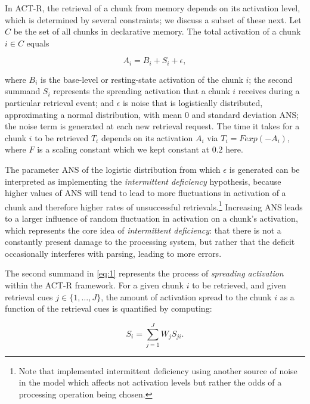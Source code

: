 \documentclass{cambridge7A}\usepackage[]{graphicx}\usepackage[]{color}
\begin{document}
In ACT-R, the retrieval of a chunk from memory depends on its activation level, which is determined by several constraints; we discuss a subset of these next. 
Let $C$ be the set of all chunks in declarative memory. The total activation of a chunk $i \in C$ equals

\begin{equation}\label{eq:1}
A_i = B_i + S_i + \epsilon,
\end{equation}

\noindent
where $B_i$ is the base-level or resting-state activation of the chunk $i$; the second summand $S_i$ represents the spreading activation that a chunk $i$ receives during a particular retrieval event; 
and $\epsilon$ is noise that is logistically distributed, approximating a normal distribution, with mean $0$ and standard deviation ANS; the noise term is generated at each new retrieval request.
The time it takes for a chunk $i$ to be retrieved $T_i$ depends on its activation $A_i$ via $T_i = F exp(-A_i)$, where $F$ is a scaling constant which we kept constant at $0.2$ here.

The parameter ANS of the logistic distribution from which $\epsilon$ is generated can be interpreted as implementing the \emph{intermittent deficiency} hypothesis, because higher values of ANS will tend to lead to more fluctuations in activation of a chunk and therefore higher rates of unsuccessful retrievals.\footnote{Note that \cite{PatilEtAl2016} implemented intermittent deficiency using another source of noise in the model which affects not activation levels but rather the odds of a processing operation being chosen.} 
Increasing ANS leads to a larger influence of random fluctuation in activation on a chunk's activation, which represents the core idea of \emph{intermittent deficiency}: that there is not a constantly present damage to the processing system, but rather that the deficit occasionally interferes with parsing, leading to more errors.

The second summand in \eqref{eq:1} represents the process of \emph{spreading activation} within the ACT-R framework. For a given chunk $i$ to be retrieved, and given retrieval cues $j \in \{1, \ldots, J\}$, the amount of activation spread to the chunk $i$ as a function of the retrieval cues is quantified by computing: 

\begin{equation}\label{eq:2}
  S_i = \sum_{j=1}^J W_j S_{ji}.
\end{equation}
\end{document}
